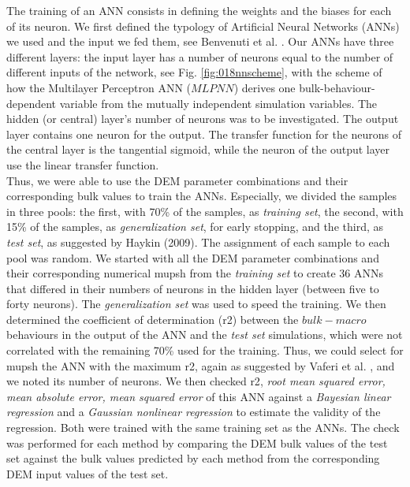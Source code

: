 The training of an \acs{ANN} consists in defining the weights and the biases for
each of its neuron.
We first defined the typology of Artificial Neural Networks (\acs{ANNs}) we used and
the input we fed them, see Benvenuti et al. \cite{RefWorks:180}.
Our \acs{ANNs} have three different layers: the input layer has a number of neurons
equal to the number of different inputs of the network, see Fig.
\ref{fig:018nnscheme}, with the scheme of how the Multilayer Perceptron \acs{ANN} ($MLPNN$) derives one
bulk-behaviour-dependent variable from the mutually independent simulation variables.
The hidden (or central) layer's number of neurons was to be investigated. 
The output layer contains one neuron for the output.
The transfer function for the neurons of the central layer is the tangential
sigmoid, while the neuron of the output layer use the linear transfer
function.\\
Thus, we were able to use the \acs{DEM} parameter combinations and their
corresponding bulk values to train the \acs{ANNs}.
Especially, we divided the samples in three pools: the first, with 70\% of the
samples, as \textit{training set}, the second, with 15\% of the samples, as
\textit{generalization set}, for early stopping, and the third, as \textit{test
set}, as suggested by Haykin (2009). The assignment of each sample to each pool
was random.
We started with all the \acs{DEM} parameter combinations and their corresponding
numerical \acs{mupsh} from the \textit{training set} to create 36 \acs{ANNs} that
differed in their numbers of neurons in the hidden layer (between five to forty neurons).
The \textit{generalization set} was used to speed the training. 
We then determined the coefficient of determination (\acs{r2}) between the
$bulk-macro$ behaviours in the output of the \acs{ANN} and the \textit{test
set} simulations, which were not correlated with the remaining 70\% used for the
training.
Thus, we could select for \acs{mupsh} the \acs{ANN} with the maximum \acs{r2}, 
again as suggested by Vaferi et al. \cite{RefWorks:150}, and we noted its number
of neurons.
We then checked \acs{r2}, \textit{root mean squared error, mean absolute error,
mean squared error} of this ANN against a \textit{Bayesian linear regression}
and a \textit{Gaussian nonlinear regression} to estimate the validity of the
regression.
Both were trained with the same training set as the ANNs. 
The check was performed for each method by comparing the DEM bulk values of 
the test set against the bulk values predicted by each method from the 
corresponding DEM input values of the test set. \\
